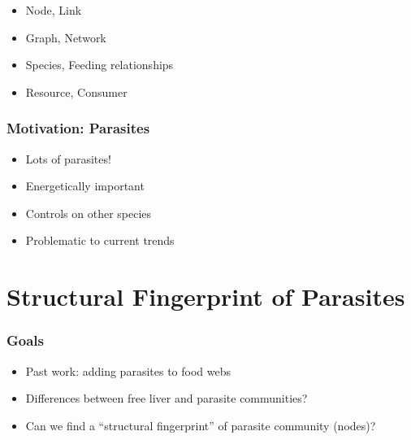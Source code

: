 \documentclass[table]{beamer}
\begin{document}
\begin{frame}
\begin{minipage}{0.49\textwidth}
    \end{minipage}
    \begin{minipage}{0.49\textwidth}
        \begin{itemize}[<+->]
            \item Node, Link
            \item Graph, Network
            \item Species, Feeding relationships
            \item Resource, Consumer
        \end{itemize}
    \end{minipage}

\end{frame}

\begin{frame}
    \frametitle{Motivation: Parasites}
    \begin{itemize}[<+->]
        \item Lots of parasites!
        \item Energetically important
        \item Controls on other species
        \item Problematic to current trends
    \end{itemize}
\end{frame}

\section{Structural Fingerprint of Parasites}

\begin{frame}
    \frametitle{Goals}
    \begin{itemize}[<+->]
        \item Past work: adding parasites to food webs
        \item Differences between free liver and parasite communities?
        \item Can we find a ``structural fingerprint'' of parasite community
            (nodes)?
    \end{itemize}
\end{frame}
\end{document}
